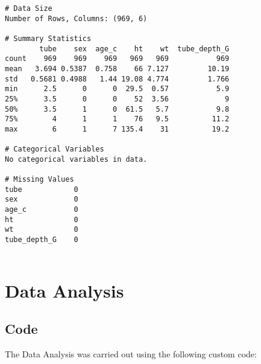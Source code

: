 \documentclass[11pt]{article}
\begin{document}
\begin{Verbatim}[tabsize=4]
# Data Size
Number of Rows, Columns: (969, 6)

# Summary Statistics
        tube    sex  age_c    ht    wt  tube_depth_G
count    969    969    969   969   969           969
mean   3.694 0.5387  0.758    66 7.127         10.19
std   0.5681 0.4988   1.44 19.08 4.774         1.766
min      2.5      0      0  29.5  0.57           5.9
25%      3.5      0      0    52  3.56             9
50%      3.5      1      0  61.5   5.7           9.8
75%        4      1      1    76   9.5          11.2
max        6      1      7 135.4    31          19.2

# Categorical Variables
No categorical variables in data.

# Missing Values
tube            0
sex             0
age_c           0
ht              0
wt              0
tube_depth_G    0


\end{Verbatim}

\section{Data Analysis}
\subsection{{Code}}
The Data Analysis was carried out using the following custom code:
\end{document}
